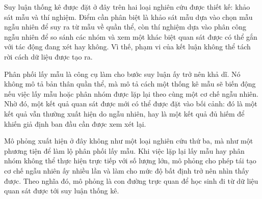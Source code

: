 \documentclass[
  10pt,
  a4paper,
  landscape,
  twoside,
  openany
]{scrbook}
\newcommand{\NOTE}[1]{#1}
\begin{document}
{
\NOTE{Suy luận thống kê được đặt ở đây trên hai loại nghiên cứu được thiết kế: khảo sát mẫu và thí nghiệm. Điểm cần phân biệt là khảo sát mẫu dựa vào chọn mẫu ngẫu nhiên để suy ra từ mẫu về quần thể, còn thí nghiệm dựa vào phân công ngẫu nhiên để so sánh các nhóm và xem một khác biệt quan sát được có thể gắn với tác động đang xét hay không. Vì thế, phạm vi của kết luận không thể tách rời cách dữ liệu được tạo ra.

Phân phối lấy mẫu là công cụ làm cho bước suy luận ấy trở nên khả dĩ. Nó không mô tả bản thân quần thể, mà mô tả cách một thống kê mẫu sẽ biến động nếu việc lấy mẫu hoặc phân nhóm được lặp lại theo cùng một cơ chế ngẫu nhiên. Nhờ đó, một kết quả quan sát được mới có thể được đặt vào bối cảnh: đó là một kết quả vẫn thường xuất hiện do ngẫu nhiên, hay là một kết quả đủ hiếm để khiến giả định ban đầu cần được xem xét lại.

Mô phỏng xuất hiện ở đây không như một loại nghiên cứu thứ ba, mà như một phương tiện để làm lộ phân phối lấy mẫu. Khi việc lặp lại lấy mẫu hay phân nhóm không thể thực hiện trực tiếp với số lượng lớn, mô phỏng cho phép tái tạo cơ chế ngẫu nhiên ấy nhiều lần và làm cho mức độ bất định trở nên nhìn thấy được. Theo nghĩa đó, mô phỏng là con đường trực quan để học sinh đi từ dữ liệu quan sát được tới suy luận thống kê.}
}
\end{document}
